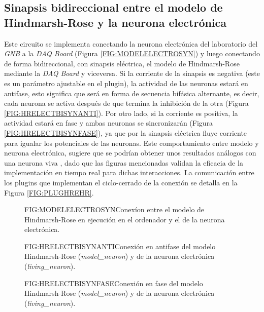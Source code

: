 \subsection{Sinapsis bidireccional entre el modelo de Hindmarsh-Rose y la neurona electrónica\label{SS:HRHRELECTRO}}


Este circuito se implementa conectando la neurona electrónica del laboratorio del \textit{GNB} \cite{Szcs2000} a la \textit{DAQ Board} (Figura \ref{FIG:MODELELECTROSYN}) y luego conectando de forma bidireccional, con sinapsis eléctrica, el modelo de Hindmarsh-Rose \cite{Hindmarsh1984, Golowasch1999} mediante la \textit{DAQ Board} y viceversa. Si la corriente de la sinapsis es negativa (este es un parámetro ajustable en el plugin), la actividad de las neuronas estará en antifase, esto significa que será en forma de secuencia bifásica alternante, es decir, cada neurona se activa después de que termina la inhibición de la otra (Figura \ref{FIG:HRELECTBISYNANTI}). Por otro lado, si la corriente es positiva, la actividad estará en fase y ambas neuronas se sincronizarán (Figura \ref{FIG:HRELECTBISYNFASE}), ya que por la sinapsis eléctrica fluye corriente para igualar los potenciales de las neuronas. Este comportamiento entre modelo y neurona electrónica, sugiere que se podrían obtener unos resultados análogos con una neurona viva \cite{Pinto2000}, dado que las figuras mencionadas validan la eficacia de la implementación en tiempo real para dichas interacciones. La comunicación entre los plugins que implementan el ciclo-cerrado de la conexión se detalla en la Figura \ref{FIG:PLUGHREHR}.

\begin{figure}[Esquema de la conexión entre el modelo y la neurona electrónica]{FIG:MODELELECTROSYN}{Conexíon entre el modelo de Hindmarsh-Rose en ejecución en el ordenador y el de la neurona electrónica.}
\end{figure}\textbf{}

\begin{figure}[Conexión bidireccional modelo-electrónica en antifase]{FIG:HRELECTBISYNANTI}{Conexión en antifase del modelo Hindmarsh-Rose (\textit{model\_neuron}) y de la neurona electrónica (\textit{living\_neuron}).}
\end{figure}

\begin{figure}[Conexión bidireccional modelo-electrónica en fase]{FIG:HRELECTBISYNFASE}{Conexión en fase del modelo Hindmarsh-Rose (\textit{model\_neuron}) y de la neurona electrónica (\textit{living\_neuron}).}
\end{figure}

